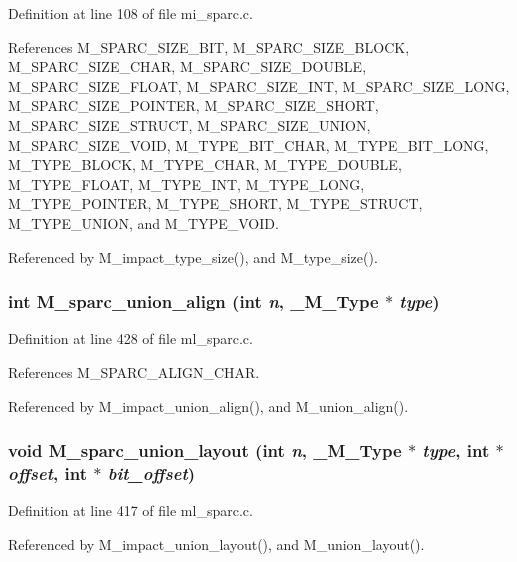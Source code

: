 Definition at line 108 of file mi\_\-sparc.c.

References M\_\-SPARC\_\-SIZE\_\-BIT, M\_\-SPARC\_\-SIZE\_\-BLOCK, M\_\-SPARC\_\-SIZE\_\-CHAR, M\_\-SPARC\_\-SIZE\_\-DOUBLE, M\_\-SPARC\_\-SIZE\_\-FLOAT, M\_\-SPARC\_\-SIZE\_\-INT, M\_\-SPARC\_\-SIZE\_\-LONG, M\_\-SPARC\_\-SIZE\_\-POINTER, M\_\-SPARC\_\-SIZE\_\-SHORT, M\_\-SPARC\_\-SIZE\_\-STRUCT, M\_\-SPARC\_\-SIZE\_\-UNION, M\_\-SPARC\_\-SIZE\_\-VOID, M\_\-TYPE\_\-BIT\_\-CHAR, M\_\-TYPE\_\-BIT\_\-LONG, M\_\-TYPE\_\-BLOCK, M\_\-TYPE\_\-CHAR, M\_\-TYPE\_\-DOUBLE, M\_\-TYPE\_\-FLOAT, M\_\-TYPE\_\-INT, M\_\-TYPE\_\-LONG, M\_\-TYPE\_\-POINTER, M\_\-TYPE\_\-SHORT, M\_\-TYPE\_\-STRUCT, M\_\-TYPE\_\-UNION, and M\_\-TYPE\_\-VOID.

Referenced by M\_\-impact\_\-type\_\-size(), and M\_\-type\_\-size().
\subsubsection{\setlength{\rightskip}{0pt plus 5cm}int M\_\-sparc\_\-union\_\-align (int {\em n}, \bf{\_\-M\_\-Type} $\ast$ {\em type})}\label{m__sparc_8h_3ce9b762400b8788a0bbb7eefe5dada8}




Definition at line 428 of file ml\_\-sparc.c.

References M\_\-SPARC\_\-ALIGN\_\-CHAR.

Referenced by M\_\-impact\_\-union\_\-align(), and M\_\-union\_\-align().
\subsubsection{\setlength{\rightskip}{0pt plus 5cm}void M\_\-sparc\_\-union\_\-layout (int {\em n}, \bf{\_\-M\_\-Type} $\ast$ {\em type}, int $\ast$ {\em offset}, int $\ast$ {\em bit\_\-offset})}\label{m__sparc_8h_84f687dcab9c62fa0849f2b1f6b18163}




Definition at line 417 of file ml\_\-sparc.c.

Referenced by M\_\-impact\_\-union\_\-layout(), and M\_\-union\_\-layout().
